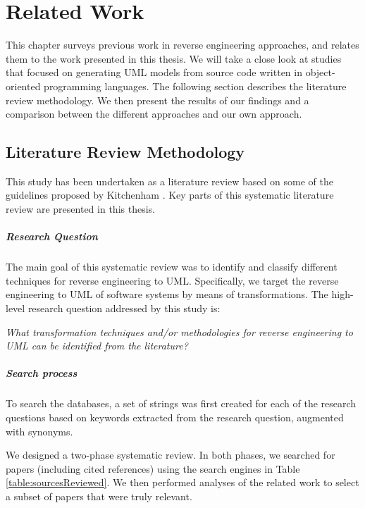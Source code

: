 \lhead{\emph{\leftmark}}  
\chapter{Related Work}
\label{chap:related}
This chapter surveys previous work in reverse engineering approaches, and relates them to the work presented in this thesis. We will take a close look at studies that focused on generating UML models from source code written in object-oriented programming languages.
The following section describes the literature review methodology. We then present the results of our findings and a comparison between the different approaches and our own approach. 

\section{Literature Review Methodology}

This study has been undertaken as a literature review based on some of the guidelines proposed by Kitchenham \cite{kitchenham2004procedures}. Key parts of this systematic literature review are presented in this thesis.

\paragraph*{Research Question}

The main goal of this systematic review was to identify and classify different techniques for reverse engineering to UML. Specifically, we target the reverse engineering to UML of software systems by means of transformations. The high-level research question addressed by this study is:

\textit{What transformation techniques and/or methodologies for reverse engineering to UML can be identified from the literature?}

\paragraph*{Search process}

To search the databases, a set of strings was first created for each of the research questions based on keywords extracted from the research question, augmented with synonyms.

We designed a two-phase systematic review. In both phases, we searched for papers (including cited references) using the search engines in Table \ref{table:sourcesReviewed}. We then performed analyses of the related work to select a subset of papers that were truly relevant.

